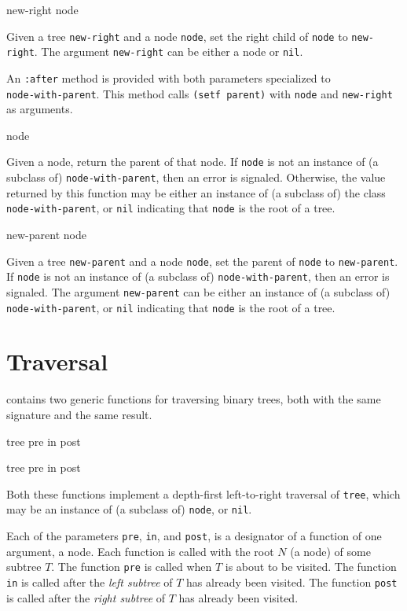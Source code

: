  {new-right node}

Given a tree \texttt{new-right} and a node \texttt{node}, set the
right child of \texttt{node} to \texttt{new-right}.  The argument
\texttt{new-right} can be either a node or \texttt{nil}.

An \texttt{:after} method is provided with both parameters specialized
to\\ \texttt{node-with-parent}.  This method calls \texttt{(setf
  parent)} with \texttt{node} and \texttt{new-right} as arguments.

 {node}

Given a node, return the parent of that node.  If \texttt{node} is not
an instance of (a subclass of) \texttt{node-with-parent}, then an
error is signaled.  Otherwise, the value returned by this function may
be either an instance of (a subclass of) the class
\texttt{node-with-parent}, or \texttt{nil} indicating that
\texttt{node} is the root of a tree.

 {new-parent node}

Given a tree \texttt{new-parent} and a node \texttt{node}, set the
parent of \texttt{node} to \texttt{new-parent}.  If \texttt{node} is
not an instance of (a subclass of) \texttt{node-with-parent}, then an
error is signaled.  The argument \texttt{new-parent} can be either an
instance of (a subclass of) \texttt{node-with-parent}, or \texttt{nil}
indicating that \texttt{node} is the root of a tree.

\section{Traversal}

\sysname{} contains two generic functions for traversing binary trees,
both with the same signature and the same result.

 {tree pre in post}

 {tree pre in post}

Both these functions implement a depth-first left-to-right traversal
of \texttt{tree}, which may be an instance of (a subclass of)
\texttt{node}, or \texttt{nil}.

Each of the parameters \texttt{pre}, \texttt{in}, and \texttt{post},
is a designator of a function of one argument, a node.  Each function
is called with the root $N$ (a node) of some subtree $T$.  The
function \texttt{pre} is called when $T$ is about to be visited.  The
function \texttt{in} is called after the \emph{left subtree} of $T$
has already been visited.  The function \texttt{post} is called after
the \emph{right subtree} of $T$ has already been visited.

